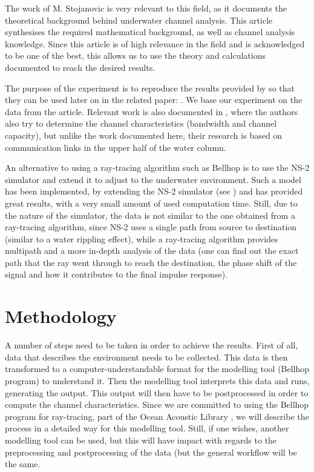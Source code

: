 \documentclass[a4paper]{IEEEtran}
\begin{document}
The work of M. Stojanovic \cite{stojanovic} is very relevant to this field, as
it documents the theoretical background behind underwater channel analysis. This
article synthesises the required mathematical background, as well as channel
analysis knowledge. Since this article is of high relevance in the field and is
acknowledged to be one of the best, this allows us to use the theory and
calculations documented to reach the desired results.

The purpose of the experiment is to reproduce the results provided by
\cite{book} so that they can be used later on in the related paper: \cite{nds}.
We base our experiment on the data from the article. Relevant work is also
documented in \cite{hayward}, where the authors also try to determine the
channel characteristics (bandwidth and channel capacity), but unlike the work
documented here, their research is based on communication links in the upper
half of the water column.

An alternative to using a ray-tracing algorithm such as Bellhop is to use the
NS-2 simulator and extend it to adjust to the underwater environment. Such a
model has been implemented, by extending the NS-2 simulator (see \cite{ns2}) and
has provided great results, with a very small amount of used computation time.
Still, due to the nature of the simulator, the data is not similar to the one
obtained from a ray-tracing algorithm, since NS-2 uses a single path from source
to destination (similar to a water rippling effect), while a ray-tracing
algorithm provides multipath and a more in-depth analysis of the data (one can
find out the exact path that the ray went through to reach the destination, the
phase shift of the signal and how it contributes to the final impulse response).

\section{Methodology}
A number of steps need to be taken in order to achieve the results. First of
all, data that describes the environment needs to be collected. This data is
then transformed to a computer-understandable format for the modelling tool
(Bellhop program) to understand it. Then the modelling tool interprets this data
and runs, generating the output. This output will then have to be postprocessed
in order to compute the channel characteristics. Since we are committed to using
the Bellhop program for ray-tracing, part of the Ocean Acoustic Library
\cite{oal}, we will describe the process in a detailed way for this modelling
tool. Still, if one wishes, another modelling tool can be used, but this will
have impact with regards to the preprocessing and postprocessing of the data
(but the general workflow will be the same.
\end{document}
